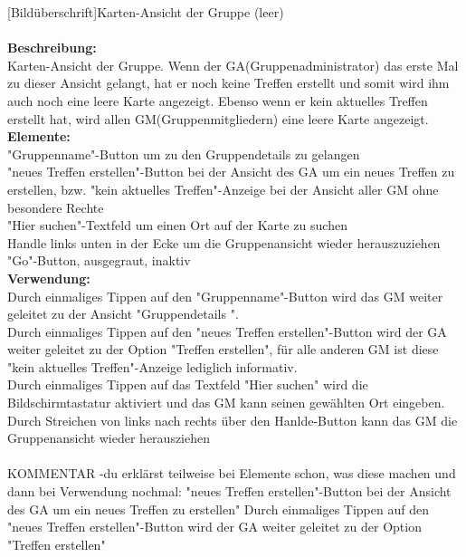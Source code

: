 [Bildüberschrift]Karten-Ansicht der Gruppe (leer)\\ \\
\textbf{Beschreibung:}\\
Karten-Ansicht der Gruppe. Wenn der GA(Gruppenadministrator) das erste Mal zu dieser Ansicht gelangt, hat er noch keine Treffen erstellt und somit wird ihm auch noch eine leere Karte angezeigt. Ebenso wenn er kein aktuelles Treffen erstellt hat, wird allen GM(Gruppenmitgliedern) eine leere Karte angezeigt.\\
\textbf{Elemente:}\\
"Gruppenname"-Button um zu den Gruppendetails zu gelangen\\
"neues Treffen erstellen"-Button bei der Ansicht des GA um ein neues Treffen zu erstellen, bzw. "kein aktuelles Treffen"-Anzeige bei der Ansicht aller GM ohne besondere Rechte\\
"Hier suchen"-Textfeld um einen Ort auf der Karte zu suchen\\
Handle links unten in der Ecke um die Gruppenansicht wieder herauszuziehen\\
"Go"-Button, ausgegraut, inaktiv\\
\textbf{Verwendung:}\\
Durch einmaliges Tippen auf den "Gruppenname"-Button wird das GM weiter geleitet zu der Ansicht "Gruppendetails ".\\
Durch einmaliges Tippen auf den "neues Treffen erstellen"-Button wird der GA weiter geleitet zu der Option "Treffen erstellen", für alle anderen GM ist diese "kein aktuelles Treffen"-Anzeige lediglich informativ.\\
Durch einmaliges Tippen auf das Textfeld "Hier suchen" wird die Bildschirmtastatur aktiviert und das GM kann seinen gewählten Ort eingeben.\\
Durch Streichen von links nach rechts über den Hanlde-Button kann das GM die Gruppenansicht wieder herausziehen\\ \\

KOMMENTAR
-du erklärst teilweise bei Elemente schon, was diese machen und dann bei Verwendung nochmal: "neues Treffen erstellen"-Button bei der Ansicht des GA um ein neues Treffen zu erstellen"
Durch einmaliges Tippen auf den "neues Treffen erstellen"-Button wird der GA weiter geleitet zu der Option "Treffen erstellen"

